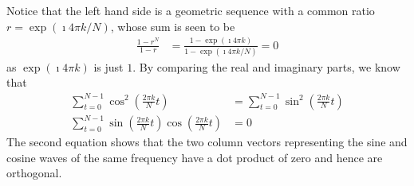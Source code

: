 Notice that the left hand side is a geometric sequence with a common ratio $r = \exp(\imath 4\pi k/N)$, whose sum is seen to be
\begin{align*}
\frac{1-r^N}{1-r} &= \frac{1 - \exp(\imath 4\pi k)}{1 - \exp(\imath 4\pi k/N)} = 0
\end{align*}
as $\exp(\imath 4\pi k)$ is just $1$. By comparing the real and imaginary parts, we know that
\begin{align}
\sum_{t=0}^{N-1} \cos^2(\frac{2\pi k}{N} t) &= \sum_{t=0}^{N-1} \sin^2(\frac{2\pi k}{N} t) \label{eqn:sumofsincossq} \\
\sum_{t=0}^{N-1} \sin(\frac{2\pi k}{N} t)\cos(\frac{2\pi k}{N} t) &= 0
\end{align}
The second equation shows that the two column vectors representing the sine and cosine waves of the same frequency have a dot product of zero and hence are orthogonal. \par 

